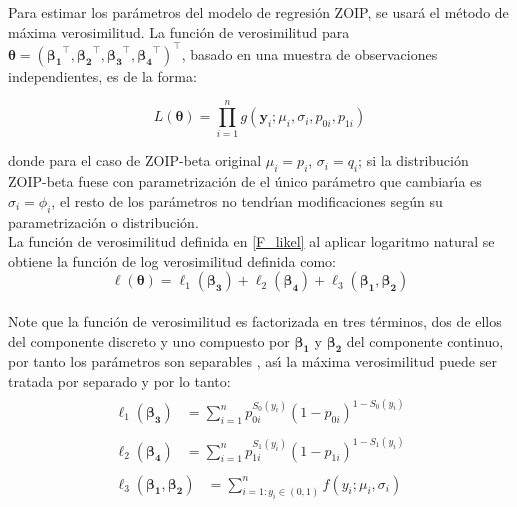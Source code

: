 Para estimar los par\'{a}metros del modelo de regresi\'{o}n ZOIP, se usar\'{a} el m\'{e}todo de m\'{a}xima verosimilitud. La funci\'{o}n de verosimilitud para $\boldsymbol{\theta}=(\boldsymbol{\beta_1}^{\top},\boldsymbol{\beta_2}^{\top},\boldsymbol{\beta_3}^{\top}, \boldsymbol{\beta_4}^{\top})^{\top}$, basado en una muestra de observaciones independientes, es de la forma:

\begin{equation}
L(\boldsymbol{\theta})=\prod_{i=1}^{n}g(\mathbf{y}_i;\mu_i,\sigma_i,p_{0i},p_{1i}) 
\label{F_likel}
\end{equation}


donde para el caso de ZOIP-beta original $\mu_i=p_i$, $\sigma_i=q_i$; si la distribuci\'{o}n ZOIP-beta fuese con parametrizaci\'{o}n de \cite{Ferrari2} el \'{u}nico par\'{a}metro que cambiar\'{\i}a es $\sigma_i=\phi_i$, el resto de los par\'{a}metros no tendr\'{\i}an modificaciones seg\'{u}n su parametrizaci\'{o}n o distribuci\'{o}n.\\

La funci\'{o}n de verosimilitud definida en \eqref{F_likel} al aplicar logaritmo natural se obtiene la funci\'{o}n de log verosimilitud definida como:
\[
\ell(\boldsymbol{\theta})=\ell_1(\boldsymbol{\beta_3})+\ell_2(\boldsymbol{\beta_4})+\ell_3(\boldsymbol{\beta_1},\boldsymbol{\beta_2})
\]
\\
Note que la funci\'{o}n de verosimilitud es factorizada en tres t\'{e}rminos, dos de ellos del componente discreto y uno compuesto por $\boldsymbol{\beta_1}$ y $\boldsymbol{\beta_2}$ del componente continuo, por tanto los par\'{a}metros son separables \citep{Pace1}, as\'{\i} la m\'{a}xima verosimilitud puede ser tratada por separado y por lo tanto:\\
\begin{align*}
\begin{split}
	\ell_1(\boldsymbol{\beta_3}) &= \sum_{i=1}^{n}{p_{0i}^{S_0(y_i)}(1-p_{0i})^{1-S_0(y_i)}}
\end{split}\\
\begin{split}
	\ell_2(\boldsymbol{\beta_4}) &= \sum_{i=1}^{n}{p_{1i}^{S_1(y_i)}(1-p_{1i})^{1-S_1(y_i)}}
\end{split}\\
\begin{split}
	\ell_3(\boldsymbol{\beta_1},\boldsymbol{\beta_2}) &= \sum_{i=1:y_i \in (0,1)}^{n}{f(y_i;\mu_i,\sigma_i)} 
\end{split}
\end{align*}

